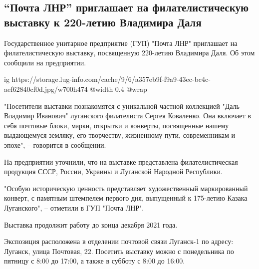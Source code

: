  
 
 
 
 
\subsection{\enquote{Почта ЛНР} приглашает на филателистическую выставку к 220-летию Владимира Даля}
\label{sec:07_12_2021.stz.news.lnr.lug_info.1.vystavka_filatelia}


Государственное унитарное предприятие (ГУП) "Почта ЛНР" приглашает на
филателистическую выставку, посвященную 220-летию Владимира Даля. Об этом
сообщили на предприятии.

\ifcmt
  ig https://storage.lug-info.com/cache/9/6/a357eb9f-f9a9-43ec-bc4c-aef62840cf0d.jpg/w700h474
  @width 0.4
  @wrap 
\fi

"Посетители выставки познакомятся с уникальной частной коллекцией "Даль
Владимир Иванович" луганского филателиста Сергея Коваленко. Она включает в себя
почтовые блоки, марки, открытки и конверты, посвященные нашему выдающемуся
земляку, его творчеству, жизненному пути, современникам и эпохе", – говорится в
сообщении.

На предприятии уточнили, что на выставке представлена филателистическая
продукция СССР, России, Украины и Луганской Народной Республики.

"Особую историческую ценность представляет художественный маркированный
конверт, с памятным штемпелем первого дня, выпущенный к 175-летию Казака
Луганского", – отметили в ГУП "Почта ЛНР".

Выставка продолжит работу до конца декабря 2021 года.

Экспозиция расположена в отделении почтовой связи Луганск-1 по адресу: Луганск,
улица Почтовая, 22. Посетить выставку можно с понедельника по пятницу с 8:00 до
17:00, а также в субботу с 8:00 до 16:00.


